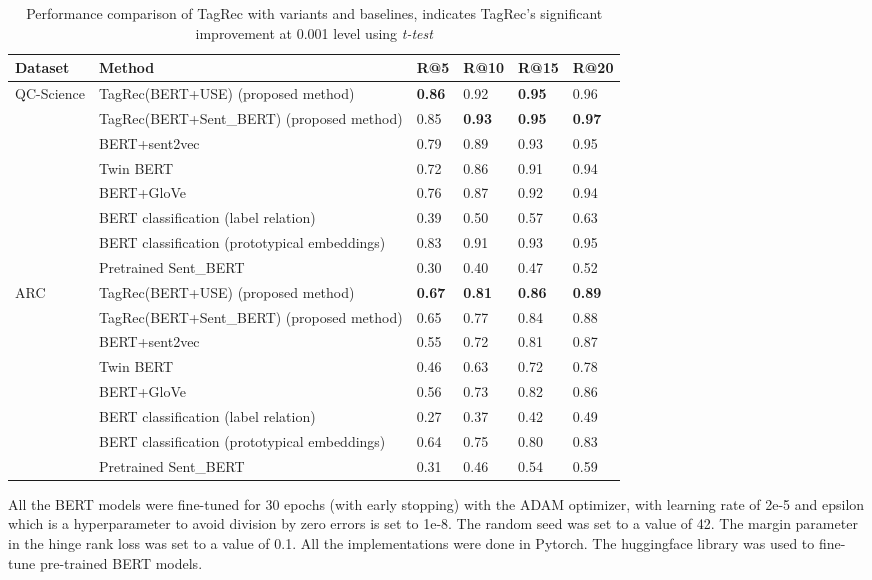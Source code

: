\documentclass[runningheads, envcountsame, a4paper]{llncs}
\begin{document}
  \begin{table}
 \centering
\caption{Performance comparison of TagRec with variants and baselines,  indicates TagRec's significant improvement at 0.001 level using \textit{t-test}}\label{tab1}
\begin{tabular}{p{1.1cm}|p{7.2cm}|p{1cm}|p{1cm}|p{1cm}|p{1cm}}
Dataset & Method &  R@5 & R@10& R@15 & R@20\\
\hline\hline
QC-Science & TagRec(BERT+USE) (proposed method) & \bf 0.86 &0.92 & \bf0.95 & 0.96\\ 
&TagRec(BERT+Sent\_BERT) (proposed method) & 0.85 & \bf 0.93 & \bf 0.95 & \bf 0.97\\ \cline{2-6}
&BERT+sent2vec & 0.79 &0.89 & 0.93 & 0.95\\ 
&Twin BERT \cite{twinbert} & 0.72 &0.86 & 0.91 & 0.94\\ 
&BERT+GloVe & 0.76 &0.87 & 0.92 & 0.94\\ \cline{2-6}
&BERT classification (label relation) \cite{xumulti} \ & 0.39 &0.50 & 0.57 & 0.63 \\ 
&BERT classification (prototypical embeddings) \cite{snell2017prototypical} & 0.83 &0.91 & 0.93 & 0.95 \\ \cline{2-6}
& Pretrained Sent\_BERT  & 0.30 &0.40 & 0.47 & 0.52 \\ 
\hline
ARC & TagRec(BERT+USE) (proposed method) & \bf 0.67 & \bf0.81 & \bf0.86 & \bf0.89\\ 
&TagRec(BERT+Sent\_BERT) (proposed method) & 0.65 &  0.77 &  0.84 &  0.88\\ \cline{2-6}
&BERT+sent2vec & 0.55 &0.72 & 0.81 & 0.87\\ 
&Twin BERT \cite{twinbert} & 0.46 &0.63 & 0.72 & 0.78\\ 
&BERT+GloVe & 0.56 &0.73 & 0.82 & 0.86\\ \cline{2-6}
&BERT classification (label relation) \cite{xumulti} \ & 0.27 &0.37 & 0.42 & 0.49 \\ 
&BERT classification (prototypical embeddings) \cite{snell2017prototypical} & 0.64 &0.75 & 0.80 & 0.83 \\ \cline{2-6}
& Pretrained Sent\_BERT  & 0.31 &0.46 & 0.54 & 0.59 \\ 
\hline
\end{tabular}
\end{table}



All the BERT models were fine-tuned for 30 epochs (with early stopping) with the ADAM optimizer, with learning rate of 2e-5 \cite{BERT} and epsilon which is a hyperparameter to avoid division by zero errors is set to 1e-8.
The random seed was set to a value of 42. The margin parameter in the hinge rank loss was set to a value of 0.1. All the implementations were done in Pytorch. The huggingface library \cite{wolf-etal-2020-transformers} was used to fine-tune pre-trained BERT models.
\end{document}
